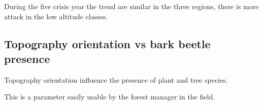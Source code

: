 \documentclass[3p,procedia]{elsarticle}
\begin{document}
During the five crisis year the trend are similar in the three regions, there is more attack in the low altitude classes. 



	


\subsection{Topography orientation vs bark beetle presence}

Topography orientation influence the presence of plant and tree species. 

This is a parameter easily usable by the forest manager in the field.  
\end{document}
